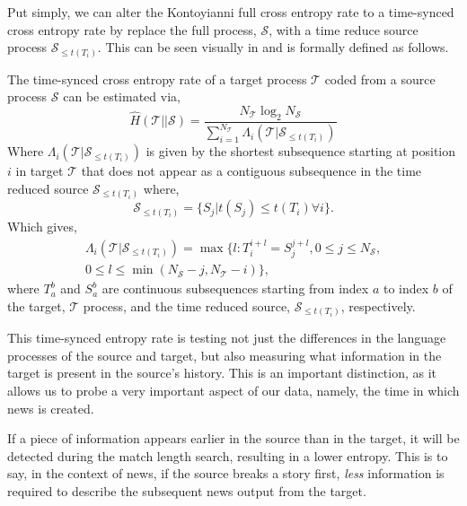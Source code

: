 Put simply, we can alter the Kontoyianni full cross entropy rate to a time-synced cross entropy rate by replace the full {\color{source}} process, $\mathcal{S}$, with a time reduce source process $\mathcal{S}_{ \leq t(T_i)}$. This can be seen visually in  and is formally defined as follows.

\begin{definition}
	The time-synced cross entropy rate of a {\color{target} target process} $\mathcal{T}$ coded from a {\color{source} source process} $\mathcal{S}$ can be estimated via,
	\begin{equation}
	\hat{H}(\mathcal{T} || \mathcal{S})=\frac{N_{\mathcal{T}} \log _{2} N_{\mathcal{S}}}{\sum_{i=1}^{N_{\mathcal{T}}} \Lambda_{i}(\mathcal{T}| \mathcal{S}_{\leq t(T_i) } )}
	\end{equation}
	Where $\Lambda_{i}(\mathcal{T}| \mathcal{S}_{\leq t(T_i) })$ is given by the shortest subsequence starting at position $i$ in {\color{target}target} $\mathcal{T}$ that does not appear as a contiguous subsequence in the time reduced {\color{source}source} $\mathcal{S}_{\leq t(T_i) }$ where,
	\begin{equation}
	\mathcal{S}_{\leq t(T_i) } = \{S_j | t(S_j) \leq t(T_i) \forall i \}.
	\end{equation}
	Which gives,
	\begin{align*}
	\Lambda_{i}(\mathcal{T}| \mathcal{S}_{\leq t(T_i)}) = \max \{l: T_i^{i+l}=S_{j}^{j+l}, 0 \leq j \leq N_{\mathcal{S}},  \\  0 \leq l \leq \min( N_{\mathcal{S}}- j , N_{\mathcal{T}}- i ) \},
	\end{align*}
	where $T_a^{b}$ and $S_a^b$ are continuous subsequences starting from index $a$ to index $b$ of the {\color{target} target}, $\mathcal{T}$ process, and the time reduced {\color{source} source}, $\mathcal{S}_{\leq t(T_i)}$, respectively.
\end{definition}
 
This time-synced entropy rate is testing not just the differences in the language processes of the source and target, but also measuring what information in the target is present in the source's history. This is an important distinction, as it allows us to probe a very important aspect of our data, namely, the time in which news is created. 

If a piece of information appears earlier in the source than in the target, it will be detected during the match length search, resulting in a lower entropy. This is to say, in the context of news, if the {\color{source}source} breaks a story first, \emph{less} information is required to describe the subsequent news output from the {\color{target}target}. 

